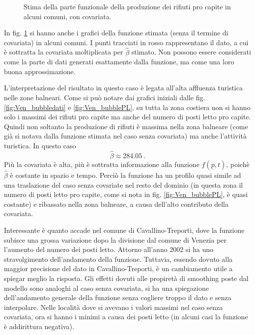 \documentclass[a4paper,11pt,twoside,openright]{book}							%
\begin{document}
\begin{figure}[t]
{   }
	\caption{Stima della parte funzionale della produzione dei rifiuti pro capite in alcuni comuni, con covariata.}
	\label{fig:Vencovar_tempo}
\end{figure}
\newpage
In fig. \ref{fig:Vencovar_tempo} si hanno anche i grafici della funzione stimata (senza il termine di covariata) in alcuni comuni. I punti tracciati in rosso rappresentano il dato, a cui è sottratta la covariata moltiplicata per $\hat{\beta}$ stimato. Non possono essere considerati come la parte di dati generati esattamente dalla funzione, ma come una loro buona approssimazione.

L'interpretazione del risultato in questo caso è legata all'alta affluenza turistica nelle zone balneari. Come si può notare dai grafici iniziali dalle fig. \ref{fig:Ven_bubbledati} e \ref{fig:Ven_bubblePL}, su tutta la zona costiera non si hanno solo i massimi dei rifiuti pro capite ma anche del numero di posti letto pro capite. Quindi non soltanto la produzione di rifiuti è massima nella zona balneare (come già si notava dalla funzione stimata nel caso senza covariata) ma anche l'attività turistica. In questo caso
$$
\hat{\beta}\approx284.05 \ .
$$
Più la covariata è alta, più è sottratta informazione alla funzione $f(\underline p,t)$, poichè $\hat{\beta}$ è costante in spazio e tempo. Perciò la funzione ha un profilo quasi simile ad una traslazione del caso senza covariate nel resto del dominio (in questa zona il numero di posti letto pro capite, come si nota in fig. \ref{fig:Ven_bubblePL}, è quasi costante) e ribassato nella zona balneare, a causa dell'alto contributo della covariata.

Interessante è quanto accade nel comune di Cavallino-Treporti, dove la funzione subisce una grossa variazione dopo la divisione dal comune di Venezia per l'aumento del numero dei posti letto. Attorno all'anno 2002 si ha uno stravolgimento dell'andamento della funzione. Tuttavia, essendo dovuto alla maggior precisione del dato in Cavallino-Treporti, è un cambiamento utile a spiegar meglio la risposta. Gli effetti dovuti alle propiretà di smoothing poste dal modello sono analoghi al caso senza covariata, si ha una spiegazione dell'andamento generale della funzione senza cogliere troppo il dato e senza interpolare. Nelle località dove si avevano i valori massimi nel caso senza covariata, ora si hanno i minimi a causa dei posti letto (in alcuni casi la funzione è addirittura negativa).
\end{document}
